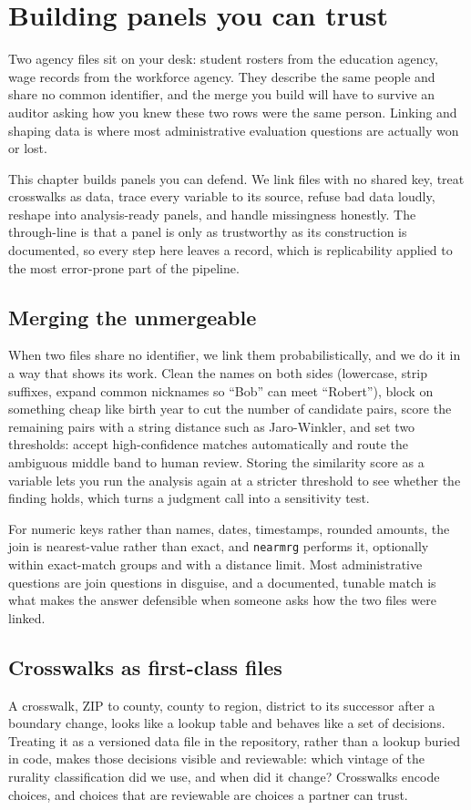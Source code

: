 \documentclass[
    a4paper,
    fontsize=10pt,
    twoside=true,
    numbers=noenddot,
]{kaobook}
\begin{document}
\chapter{Building panels you can trust}\label{ch:panels}

Two agency files sit on your desk: student rosters from the education agency, wage records from the workforce agency. They describe the same people and share no common identifier, and the merge you build will have to survive an auditor asking how you knew these two rows were the same person. Linking and shaping data is where most administrative evaluation questions are actually won or lost.

This chapter builds panels you can defend. We link files with no shared key, treat crosswalks as data, trace every variable to its source, refuse bad data loudly, reshape into analysis-ready panels, and handle missingness honestly. The through-line is that a panel is only as trustworthy as its construction is documented, so every step here leaves a record, which is replicability applied to the most error-prone part of the pipeline.

\section{Merging the unmergeable}
When two files share no identifier, we link them probabilistically, and we do it in a way that shows its work. Clean the names on both sides (lowercase, strip suffixes, expand common nicknames so \enquote{Bob} can meet \enquote{Robert}), block on something cheap like birth year to cut the number of candidate pairs, score the remaining pairs with a string distance such as Jaro-Winkler, and set two thresholds: accept high-confidence matches automatically and route the ambiguous middle band to human review. Storing the similarity score as a variable lets you run the analysis again at a stricter threshold to see whether the finding holds, which turns a judgment call into a sensitivity test.

For numeric keys rather than names, dates, timestamps, rounded amounts, the join is nearest-value rather than exact, and \texttt{nearmrg} performs it, optionally within exact-match groups and with a distance limit. Most administrative questions are join questions in disguise, and a documented, tunable match is what makes the answer defensible when someone asks how the two files were linked.

\section{Crosswalks as first-class files}
A crosswalk, ZIP to county, county to region, district to its successor after a boundary change, looks like a lookup table and behaves like a set of decisions. Treating it as a versioned data file in the repository, rather than a lookup buried in code, makes those decisions visible and reviewable: which vintage of the rurality classification did we use, and when did it change? Crosswalks encode choices, and choices that are reviewable are choices a partner can trust.
\end{document}
